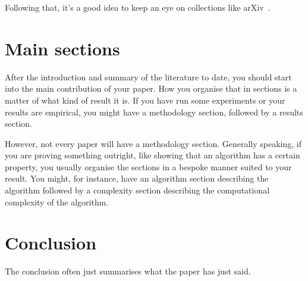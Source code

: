 \documentclass[journal]{IEEEtran}
\begin{document}
    Following that, it's a good idea to keep an eye on collections like
    arXiv~\cite{arxiv:home}.

  \section{Main sections}
    After the introduction and summary of the literature to date, you should start
    into the main contribution of your paper. How you organise that in sections
    is a matter of what kind of result it is. If you have run some experiments
    or your results are empirical, you might have a methodology section, followed
    by a results section.

    However, not every paper will have a methodology section. Generally speaking,
    if you are proving something outright, like showing that an algorithm has a
    certain property, you usually organise the sections in a bespoke manner suited
    to your result. You might, for instance, have an algorithm section describing
    the algorithm followed by a complexity section describing the computational
    complexity of the algorithm.

  \section{Conclusion}
    The conclusion often just summarises what the paper has just said.

  
  
\end{document}
